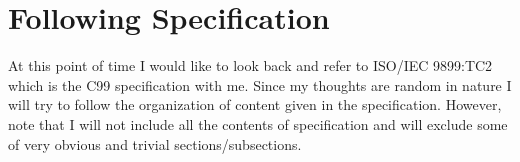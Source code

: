 \chapter{Following Specification}
\startcolumns[n=3,distance=2em]
  \placelist
    [section]
    [alternative=c, %
     interaction=all,]
\stopcolumns


At this point of time I would like to look back and refer to ISO/IEC
9899:TC2 which is the C99 specification with me. Since my thoughts are
random in nature I will try to follow the organization of content
given in the specification. However, note that I will not include all
the contents of specification and will exclude some of very obvious
and trivial sections/subsections.

